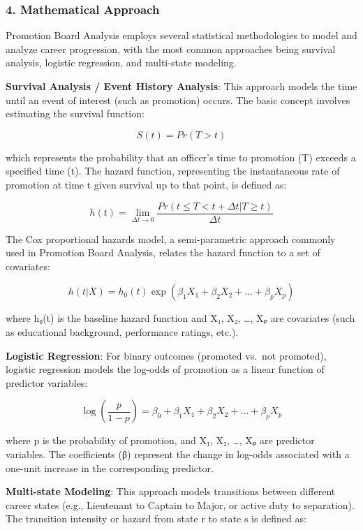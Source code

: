 \documentclass[./main.tex]{subfiles}
\begin{document}
\subsubsection{4. Mathematical Approach}\label{mathematical-approach}

Promotion Board Analysis employs several statistical methodologies to
model and analyze career progression, with the most common approaches
being survival analysis, logistic regression, and multi-state modeling.

\textbf{Survival Analysis / Event History Analysis}: This approach
models the time until an event of interest (such as promotion) occurs.
The basic concept involves estimating the survival function:

\[ S(t) = Pr(T > t) \]

which represents the probability that an officer's time to promotion (T)
exceeds a specified time (t). The hazard function, representing the
instantaneous rate of promotion at time t given survival up to that
point, is defined as:

\[ h(t) = \lim_{\Delta t \to 0} \frac{Pr(t \leq T < t + \Delta t | T \geq t)}{\Delta t} \]

The Cox proportional hazards model, a semi-parametric approach commonly
used in Promotion Board Analysis, relates the hazard function to a set
of covariates:

\[ h(t|X) = h_0(t) \exp(\beta_1 X_1 + \beta_2 X_2 + ... + \beta_p X_p) \]

where h₀(t) is the baseline hazard function and X₁, X₂, \ldots, Xₚ are
covariates (such as educational background, performance ratings, etc.).

\textbf{Logistic Regression}: For binary outcomes (promoted vs.~not
promoted), logistic regression models the log-odds of promotion as a
linear function of predictor variables:

\[ \log\left(\frac{p}{1-p}\right) = \beta_0 + \beta_1 X_1 + \beta_2 X_2 + ... + \beta_p X_p \]

where p is the probability of promotion, and X₁, X₂, \ldots, Xₚ are
predictor variables. The coefficients (β) represent the change in
log-odds associated with a one-unit increase in the corresponding
predictor.

\textbf{Multi-state Modeling}: This approach models transitions between
different career states (e.g., Lieutenant to Captain to Major, or active
duty to separation). The transition intensity or hazard from state r to
state s is defined as:
\end{document}
